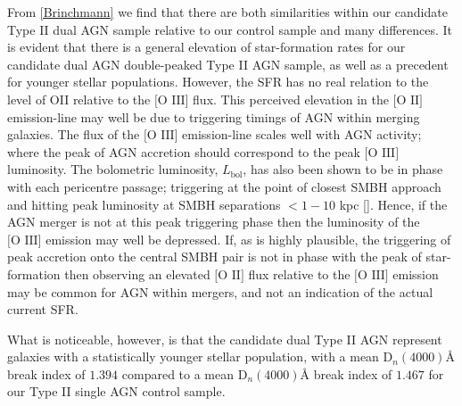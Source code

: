From \ref{Brinchmann} we find that there are both similarities within our candidate Type II dual AGN sample relative to our control sample and many differences. It is evident that there is a general elevation of star-formation rates for our candidate dual AGN double-peaked Type II AGN sample, as well as a precedent for younger stellar populations. However, the SFR has no real relation to the level of OII relative to the $\text{[O III]}$ flux. This perceived elevation in the $\text{[O II]}$ emission-line may well be due to triggering timings of AGN within merging galaxies. The flux of the $\text{[O III]}$ emission-line scales well with AGN activity; where the peak of AGN accretion should correspond to the peak $\text{[O III]}$ luminosity. The bolometric luminosity, $L_{\text{bol}}$, has also been shown to be in phase with each pericentre passage; triggering at the point of closest SMBH approach and hitting peak luminosity at SMBH separations $<{1-10}$ kpc [\cite{Van_Wassenhove_2012}]. Hence, if the AGN merger is not at this peak triggering phase then the luminosity of the $\text{[O III]}$ emission may well be depressed. If, as is highly plausible, the triggering of peak accretion onto the central SMBH pair is not in phase with the peak of star-formation then observing an elevated $\text{[O II]}$ flux relative to the $\text{[O III]}$ emission may be common for AGN within mergers, and not an indication of the actual current SFR.  

What is noticeable, however, is that the candidate dual Type II AGN represent galaxies with a statistically younger stellar population, with a mean $\text{D}_{n}(4000)Å$ break index of $1.394$ compared to a mean $\text{D}_{n}(4000)Å$ break index of $1.467$ for our Type II single AGN control sample.     

